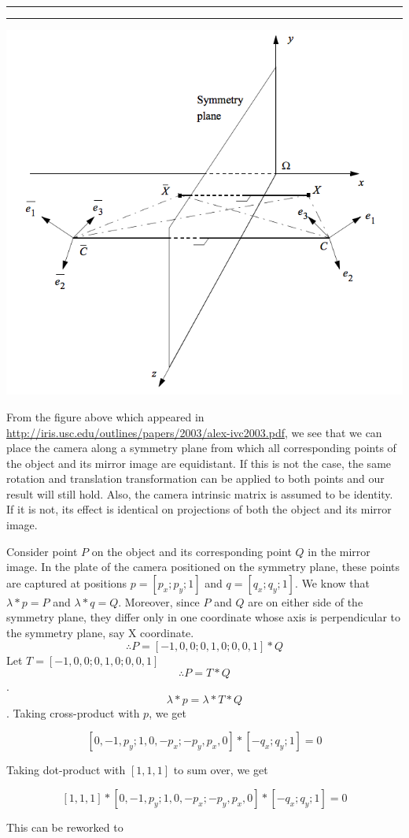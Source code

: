\documentclass[12pt]{article}\sloppy
\newcommand{\question}[2] {\vspace{.25in} \hrule\vspace{0.5em} \noindent{\bf #1: #2} \vspace{0.5em} \hrule \vspace{.10in}}
\begin{document}
\question{1.3}{}

\includegraphics[width=0.8\linewidth]{fig2.png}

From the figure above which appeared in \url{http://iris.usc.edu/outlines/papers/2003/alex-ivc2003.pdf}, we see that we can place the camera along a symmetry plane from which all corresponding points of the object and its mirror image are equidistant. If this is not the case, the same rotation and translation transformation can be applied to both points and our result will still hold. Also, the camera intrinsic matrix is assumed to be identity. If it is not, its effect is identical on projections of both the object and its mirror image.

Consider point $P$ on the object and its corresponding point $Q$ in the mirror image. In the plate of the camera positioned on the symmetry plane, these points are captured at positions $p=[p_x;p_y;1]$ and $q=[q_x;q_y;1]$. We know that $\lambda * p = P$ and $\lambda * q = Q$. Moreover, since $P$ and $Q$ are on either side of the symmetry plane, they differ only in one coordinate whose axis is perpendicular to the symmetry plane, say X coordinate. $$\therefore P = [-1,0,0;0,1,0;0,0,1] * Q$$ Let $T = [-1,0,0;0,1,0;0,0,1]$ $$\therefore P=T*Q$$. $$\lambda * p = \lambda * T*Q$$. Taking cross-product with $p$, we get

$$[0,-1,p_y;1,0,-p_x;-p_y,p_x,0]*[-q_x;q_y;1] = 0$$

Taking dot-product with $[1,1,1]$ to sum over, we get 

$$[1,1,1]*[0,-1,p_y;1,0,-p_x;-p_y,p_x,0]*[-q_x;q_y;1] = 0$$

This can be reworked to
\end{document}
